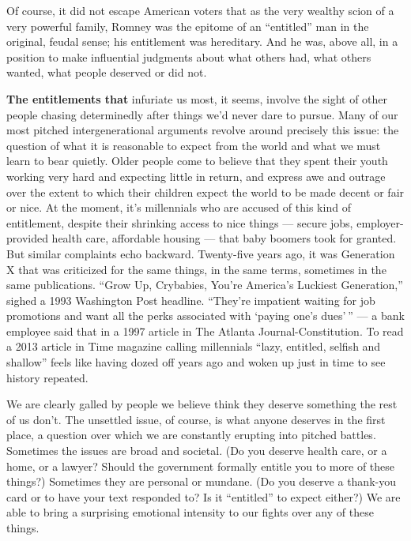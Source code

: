 Of course, it did not escape American voters that as the very wealthy
scion of a very powerful family, Romney was the epitome of an
``entitled'' man in the original, feudal sense; his entitlement was
hereditary. And he was, above all, in a position to make influential
judgments about what others had, what others wanted, what people
deserved or did not.

\textbf{The entitlements that} infuriate us most, it seems, involve the
sight of other people chasing determinedly after things we'd never dare
to pursue. Many of our most pitched intergenerational arguments revolve
around precisely this issue: the question of what it is reasonable to
expect from the world and what we must learn to bear quietly. Older
people come to believe that they spent their youth working very hard and
expecting little in return, and express awe and outrage over the extent
to which their children expect the world to be made decent or fair or
nice. At the moment, it's millennials who are accused of this kind of
entitlement, despite their shrinking access to nice things --- secure
jobs, employer-provided health care, affordable housing --- that baby
boomers took for granted. But similar complaints echo backward.
Twenty-five years ago, it was Generation X that was criticized for the
same things, in the same terms, sometimes in the same publications.
``Grow Up, Crybabies, You're America's Luckiest Generation,'' sighed a
1993 Washington Post headline. ``They're impatient waiting for job
promotions and want all the perks associated with `paying one's dues' ''
--- a bank employee said that in a 1997 article in The Atlanta
Journal-Constitution. To read a 2013 article in Time magazine calling
millennials ``lazy, entitled, selfish and shallow'' feels like having
dozed off years ago and woken up just in time to see history repeated.

We are clearly galled by people we believe think they deserve something
the rest of us don't. The unsettled issue, of course, is what anyone
deserves in the first place, a question over which we are constantly
erupting into pitched battles. Sometimes the issues are broad and
societal. (Do you deserve health care, or a home, or a lawyer? Should
the government formally entitle you to more of these things?) Sometimes
they are personal or mundane. (Do you deserve a thank-you card or to
have your text responded to? Is it ``entitled'' to expect either?) We
are able to bring a surprising emotional intensity to our fights over
any of these things.

